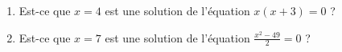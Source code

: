 
\begin{exercice}\label{exosmath-0644}

    \begin{enumerate}
        \item
    Est-ce que \( x=4\) est une solution de l'équation \( x(x+3)=0\) ?
\item
    Est-ce que \( x=7\) est une solution de l'équation \( \frac{ x^2-49 }{ 2 }=0\) ?
    \end{enumerate}

\end{exercice}
